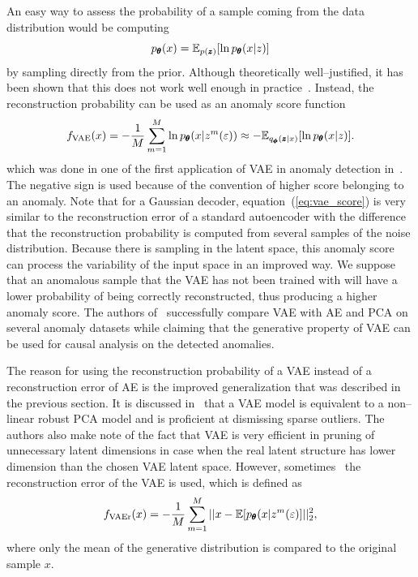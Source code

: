 An easy way to assess the probability of a sample coming from the
data distribution would be computing 
\begin{equation}
p_{\vc{\theta}}(x)=\mathbb{E}_{p(\vc{z})}\left[\ln p_{\vc{\theta}}(x|z)\right]
\end{equation}
by sampling directly from the prior. Although theoretically well--justified,
it has been shown that this does not work well enough in practice~\cite{xu2018unsupervised}.
Instead, the reconstruction probability can be used as an anomaly
score function
\begin{equation}
f_{\text{VAE}}(x)=-\frac{1}{M}\sum_{m=1}^{M}\ln p_{\vc{\theta}}(x|z^{m}(\varepsilon))\approx-\mathbb{E}_{q_{\vc{\phi}}(\vc{z}|x)}\left[\ln p_{\vc{\theta}}(x|z)\right].\label{eq:vae_score}
\end{equation}
which was done in one of the first application of VAE in anomaly detection
in~\cite{an2015variational}. The negative sign is used because
of the convention of higher score belonging to an anomaly. Note that
for a Gaussian decoder, equation~(\ref{eq:vae_score}) is very similar
to the reconstruction error of a standard autoencoder with the difference
that the reconstruction probability is computed from several samples
of the noise distribution. Because there is sampling in the latent
space, this anomaly score can process the variability of the input
space in an improved way. We suppose that an anomalous sample that
the VAE has not been trained with will have a lower probability of
being correctly reconstructed, thus producing a higher anomaly score.
The authors of~\cite{an2015variational} successfully compare VAE
with AE and PCA on several anomaly datasets while claiming that the
generative property of VAE can be used for causal analysis on the
detected anomalies.

The reason for using the reconstruction probability of a VAE instead
of a reconstruction error of AE is the improved generalization that
was described in the previous section. It is discussed in~\cite{dai2017hidden}
that a VAE model is equivalent to a non--linear robust PCA model
and is proficient at dismissing sparse outliers. The authors also
make note of the fact that VAE is very efficient in pruning of unnecessary
latent dimensions in case when the real latent structure has lower
dimension than the chosen VAE latent space. However, sometimes~\cite{pereira2018unsupervised}
the reconstruction error of the VAE is used, which is defined as
\begin{equation}
f_{\text{VAEr}}(x)=-\frac{1}{M}\sum_{m=1}^{M}||x-\mathbb{E}\left[p_{\vc{\theta}}(x|z^{m}(\varepsilon)\right]||_{2}^{2},
\end{equation}
where only the mean of the generative distribution is compared to
the original sample $x$.

